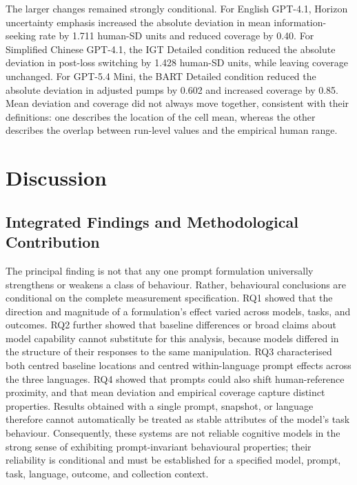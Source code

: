 \documentclass[logo,msc]{infthesis}
\begin{document}
The larger changes remained strongly conditional. For English GPT-4.1, Horizon uncertainty emphasis increased the absolute deviation in mean information-seeking rate by 1.711 human-SD units and reduced coverage by 0.40. For Simplified Chinese GPT-4.1, the IGT Detailed condition reduced the absolute deviation in post-loss switching by 1.428 human-SD units, while leaving coverage unchanged. For GPT-5.4 Mini, the BART Detailed condition reduced the absolute deviation in adjusted pumps by 0.602 and increased coverage by 0.85. Mean deviation and coverage did not always move together, consistent with their definitions: one describes the location of the cell mean, whereas the other describes the overlap between run-level values and the empirical human range.

\chapter{Discussion}
\label{sec:discussion}

\section{Integrated Findings and Methodological Contribution}

The principal finding is not that any one prompt formulation universally strengthens or weakens a class of behaviour. Rather, behavioural conclusions are conditional on the complete measurement specification. RQ1 showed that the direction and magnitude of a formulation's effect varied across models, tasks, and outcomes. RQ2 further showed that baseline differences or broad claims about model capability cannot substitute for this analysis, because models differed in the structure of their responses to the same manipulation. RQ3 characterised both centred baseline locations and centred within-language prompt effects across the three languages. RQ4 showed that prompts could also shift human-reference proximity, and that mean deviation and empirical coverage capture distinct properties. Results obtained with a single prompt, snapshot, or language therefore cannot automatically be treated as stable attributes of the model's task behaviour. Consequently, these systems are not reliable cognitive models in the strong sense of exhibiting prompt-invariant behavioural properties; their reliability is conditional and must be established for a specified model, prompt, task, language, outcome, and collection context.
\end{document}
